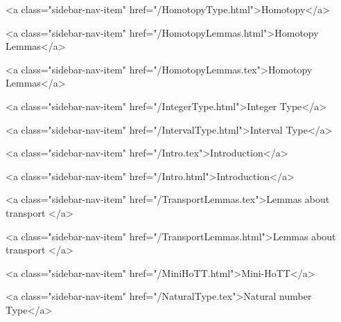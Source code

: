       
    
      
        
          <a class="sidebar-nav-item" href="/HomotopyType.html">Homotopy</a>
        
      
    
      
        
          <a class="sidebar-nav-item" href="/HomotopyLemmas.html">Homotopy Lemmas</a>
        
      
    
      
        
          <a class="sidebar-nav-item" href="/HomotopyLemmas.tex">Homotopy Lemmas</a>
        
      
    
      
        
          <a class="sidebar-nav-item" href="/IntegerType.html">Integer Type</a>
        
      
    
      
        
          <a class="sidebar-nav-item" href="/IntervalType.html">Interval Type</a>
        
      
    
      
        
          <a class="sidebar-nav-item" href="/Intro.tex">Introduction</a>
        
      
    
      
        
          <a class="sidebar-nav-item" href="/Intro.html">Introduction</a>
        
      
    
      
        
          <a class="sidebar-nav-item" href="/TransportLemmas.tex">Lemmas about transport </a>
        
      
    
      
        
          <a class="sidebar-nav-item" href="/TransportLemmas.html">Lemmas about transport </a>
        
      
    
      
        
          <a class="sidebar-nav-item" href="/MiniHoTT.html">Mini-HoTT</a>
        
      
    
      
        
          <a class="sidebar-nav-item" href="/NaturalType.tex">Natural number Type</a>
        
